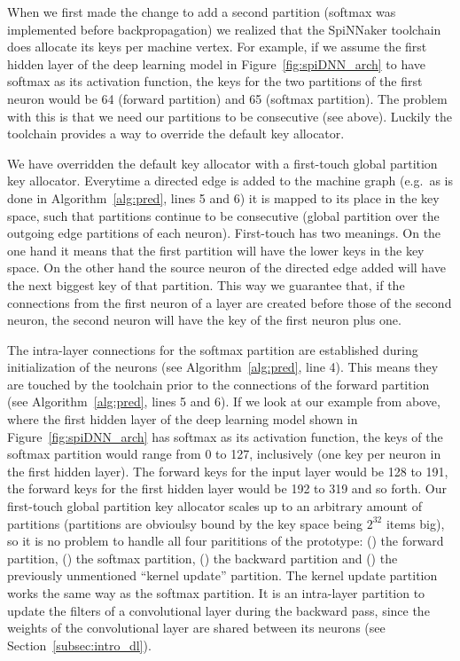 \documentclass[]{article}
\begin{document}
When we first made the change to add a second partition (softmax
was implemented before backpropagation) we realized that the
SpiNNaker toolchain does allocate its keys per machine vertex.
For example, if we assume the first hidden layer of the deep learning
model in Figure~\ref{fig:spiDNN_arch} to have softmax as its
activation function, the keys for the two partitions of the first
neuron would be 64 (forward partition) and 65 (softmax partition).
The problem with this is that we need our partitions to be
consecutive (see above).
Luckily the toolchain provides a way to override the default key
allocator.

We have overridden the default key allocator with a first-touch
global partition key allocator.
Everytime a directed edge is added to the machine graph (e.g.\ as
is done in Algorithm~\ref{alg:pred}, lines 5 and 6) it is mapped to
its place in the key space, such that partitions continue to be
consecutive (global partition over the outgoing edge partitions of
each neuron).
First-touch has two meanings.
On the one hand it means that the first partition will have the lower
keys in the key space.
On the other hand the source neuron of the directed edge added will
have the next biggest key of that partition.
This way we guarantee that, if the connections from the first neuron
of a layer are created before those of the second neuron, the second
neuron will have the key of the first neuron plus one.

The intra-layer connections for the softmax partition are established
during initialization of the neurons (see Algorithm~\ref{alg:pred},
line 4).
This means they are touched by the toolchain prior to the connections
of the forward partition (see Algorithm~\ref{alg:pred}, lines 5 and
6).
If we look at our example from above, where the first hidden layer
of the deep learning model shown in Figure~\ref{fig:spiDNN_arch} has
softmax as its activation function, the keys of the softmax partition
would range from 0 to 127, inclusively (one key per neuron in the
first hidden layer).
The forward keys for the input layer would be 128 to 191, the
forward keys for the first hidden layer would be 192 to 319 and so
forth.
Our first-touch global partition key allocator scales up to an
arbitrary amount of partitions (partitions are obvioulsy bound by the
key space being $2^{32}$ items big), so it is no problem to handle all
four parititions of the prototype:
() the forward partition, () the
softmax partition, () the backward partition and
() the previously unmentioned ``kernel update''
partition.
The kernel update partition works the same way as the softmax
partition.
It is an intra-layer partition to update the filters of a
convolutional layer during the backward pass, since the weights of
the convolutional layer are shared between its neurons
(see Section~\ref{subsec:intro_dl}).
\end{document}
